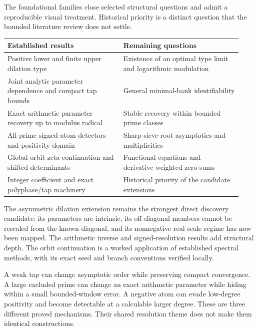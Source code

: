 The foundational families close selected structural questions and admit a reproducible visual treatment. Historical priority is a distinct question that the bounded literature review does not settle.

\begin{tabular}{@{}>{\raggedright\arraybackslash}p{0.46\linewidth}>{\raggedright\arraybackslash}p{0.47\linewidth}@{}}
\toprule
Established results & Remaining questions\\\midrule
Positive lower and finite upper dilation type & Existence of an optimal type limit and logarithmic modulation\\
Joint analytic parameter dependence and compact tap bounds & General minimal-bank identifiability\\
Exact arithmetic parameter recovery up to modulus radical & Stable recovery within bounded prime classes\\
All-prime signed-atom detectors and positivity domain & Sharp sieve-root asymptotics and multiplicities\\
Global orbit-zeta continuation and shifted determinants & Functional equations and derivative-weighted zero sums\\
Integer coefficient and exact polyphase/tap machinery & Historical priority of the candidate extensions\\
\bottomrule\end{tabular}

The asymmetric dilation extension remains the strongest direct discovery
candidate: its parameters are intrinsic, its off-diagonal members cannot be
rescaled from the known diagonal, and its nonnegative real scale regime has now been
mapped. The arithmetic inverse and signed-resolution results add structural
depth. The orbit continuation is a worked application of established spectral
methods, with its exact seed and branch conventions verified locally.

A weak tap can change asymptotic order while preserving compact convergence.
A large excluded prime can change an exact arithmetic parameter while hiding
within a small bounded-window error. A negative atom can evade low-degree
positivity and become detectable at a calculable larger degree.
These are three different proved mechanisms. Their shared resolution theme
does not make them identical constructions.

